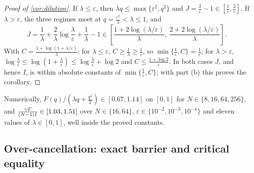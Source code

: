 \begin{proof}[Proof of \cref{cor:dilution}]
If $\lambda\le\varepsilon$, then $\lambda q\le\max\{\varepsilon^2,q^2\}$ and $J=\tfrac{2}{\varepsilon}-1\in[\tfrac{1}{\varepsilon},\tfrac{2}{\varepsilon}]$.
If $\lambda>\varepsilon$, the three regimes meet at $q=\tfrac{\varepsilon^2}{\lambda}<\lambda\le1$, and
\[
 J=\frac{1}{\lambda}+\frac{2}{\lambda}\log\frac{\lambda}{\varepsilon}+\frac{1}{\lambda}-1
 \in\left[\frac{1+2\log(\lambda/\varepsilon)}{\lambda},\ \frac{2+2\log(\lambda/\varepsilon)}{\lambda}\right].
\]
With $C=\tfrac{1+\log(1+\lambda/\varepsilon)}{\lambda}$: for $\lambda\le\varepsilon$, $C\ge\tfrac{1}{\lambda}\ge\tfrac{1}{\varepsilon}$, so $\min\{\tfrac{1}{\varepsilon},C\}=\tfrac{1}{\varepsilon}$;
for $\lambda>\varepsilon$, $\log\tfrac{\lambda}{\varepsilon}\le\log(1+\tfrac{\lambda}{\varepsilon})\le\log\tfrac{\lambda}{\varepsilon}+\log2$ and $C\le\tfrac{1+\log2}{\varepsilon}$.
In both cases $J$, and hence $I$, is within absolute constants of $\min\{\tfrac{1}{\varepsilon},C\}$; with part (b) this proves the corollary.
\end{proof}
Numerically, $F(q)/(\lambda q+\tfrac{q^2}{2})\in[0.67,1.14]$ on $[0,1]$ for $N\in\{8,16,64,256\}$, and
$\tfrac{\gamma T}{(N-1)I}\in[1.03,1.51]$ over $N\in\{16,64\}$, $\varepsilon\in\{10^{-2},10^{-3},10^{-4}\}$ and eleven values of $\lambda\in[0,1]$, well inside the proved constants.

\subsection{Over-cancellation: exact barrier and critical equality}
\label{app:critical}

